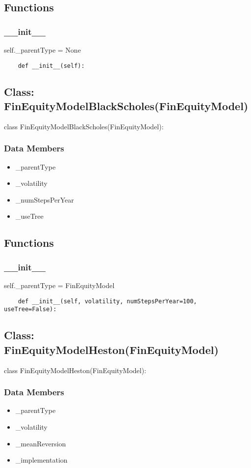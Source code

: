 \documentclass[twoside,11pt]{book}
\begin{document}
\subsection*{Functions}

\subsubsection*{{\bf \_\_init\_\_}}
self.\_parentType = None 

\begin{lstlisting}
    def __init__(self):
\end{lstlisting}

\subsection*{Class: FinEquityModelBlackScholes(FinEquityModel)}
class FinEquityModelBlackScholes(FinEquityModel): 

\subsubsection*{Data Members}
\begin{itemize}
\item{\_parentType}
\item{\_volatility}
\item{\_numStepsPerYear}
\item{\_useTree}
\end{itemize}

\subsection*{Functions}

\subsubsection*{{\bf \_\_init\_\_}}
self.\_parentType = FinEquityModel 

\begin{lstlisting}
    def __init__(self, volatility, numStepsPerYear=100, useTree=False):
\end{lstlisting}

\subsection*{Class: FinEquityModelHeston(FinEquityModel)}
class FinEquityModelHeston(FinEquityModel): 

\subsubsection*{Data Members}
\begin{itemize}
\item{\_parentType}
\item{\_volatility}
\item{\_meanReversion}
\item{\_implementation}
\end{itemize}
\end{document}
